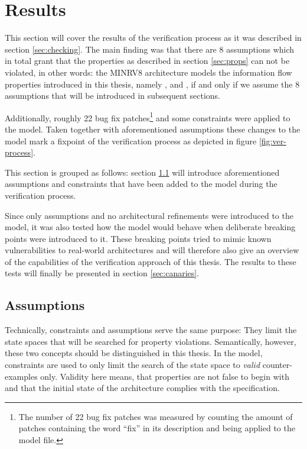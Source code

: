 
\section{Results}

This section will cover the results of the verification process as it was described in section \ref{sec:checking}.
The main finding was that there are 8 assumptions which in total grant that the properties as described in section \ref{sec:props} can not be violated, in other words: the MINRV8 architecture models the information flow properties introduced in this thesis, namely ,  and , if and only if we assume the 8 assumptions that will be introduced in subsequent sections.

Additionally, roughly 22 bug fix patches\footnote{%
    The number of 22 bug fix patches was measured by counting the amount of patches containing the word \enquote{fix} in its description and being applied to the model file.
} and some  constraints were applied to the model.
Taken together with aforementioned assumptions these changes to the model mark a fixpoint of the verification process as depicted in figure \ref{fig:ver-process}.

This section is grouped as follows: section \ref{sec:assumptions} will introduce aforementioned assumptions and  constraints that have been added to the model during the verification process.

Since only assumptions and no architectural refinements were introduced to the model, it was also tested how the model would behave when deliberate breaking points were introduced to it.
These breaking points tried to mimic known vulnerabilities to real-world architectures and will therefore also give an overview of the capabilities of the verification approach of this thesis.
The results to these tests will finally be presented in section \ref{sec:canaries}.

\subsection{Assumptions}
\label{sec:assumptions}

Technically,  constraints and assumptions serve the same purpose: They limit the state spaces that will be searched for property violations.
Semantically, however, these two concepts should be distinguished in this thesis.
In the model,  constraints are used to only limit the search of the state space to \textit{valid} counter-examples only.
Validity here means, that properties are not false to begin with and that the initial state of the architecture complies with the specification.

